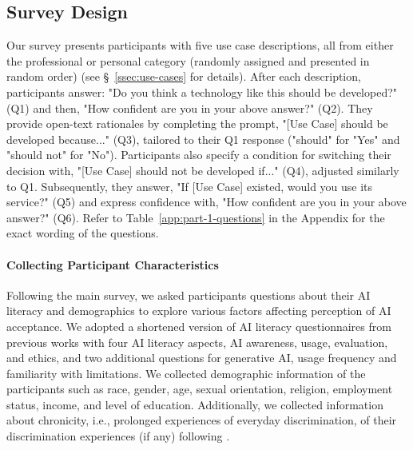 \subsection{Survey Design}
\label{ssec:survey-design}
Our survey presents participants with five use case descriptions, all from either the professional or personal category (randomly assigned and presented in random order) (see \S~\ref{ssec:use-cases} for details). After each description, participants answer: "Do you think a technology like this should be developed?" (Q1) and then, "How confident are you in your above answer?" (Q2). They provide open-text rationales by completing the prompt, "[Use Case] should be developed because..." (Q3), tailored to their Q1 response ("should" for "Yes" and "should not" for "No"). Participants also specify a condition for switching their decision with, "[Use Case] should not be developed if..." (Q4), adjusted similarly to Q1. Subsequently, they answer, "If [Use Case] existed, would you use its service?" (Q5) and express confidence with, "How confident are you in your above answer?" (Q6). Refer to Table~\ref{app:part-1-questions} in the Appendix for the exact wording of the questions.

\paragraph{Collecting Participant Characteristics}
Following the main survey, we asked participants questions about their AI literacy and demographics to explore various factors affecting perception of AI acceptance. We adopted a shortened version of AI literacy questionnaires from previous works \citep{wang2023measuring,mun2024participaidemocraticsurveyingframework} with four AI literacy aspects, AI awareness, usage, evaluation, and ethics, and two additional questions for generative AI, usage frequency and familiarity with limitations. We collected demographic information of the participants such as race, gender, age, sexual orientation, religion, employment status, income, and level of education. Additionally, we collected information about chronicity, i.e., prolonged experiences of everyday discrimination, of their discrimination experiences (if any) following \citeauthor{kingsley2024investigating}.  

